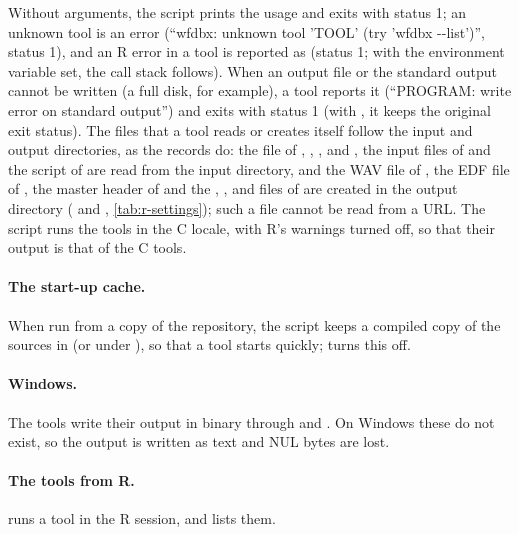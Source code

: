 Without arguments, the script prints the usage and exits with status 1; an unknown tool
is an error (``wfdbx: unknown tool 'TOOL' (try 'wfdbx -{}-list')'', status 1), and an R
error in a tool is reported as  (status 1; with the
environment variable  set, the call stack follows). When an output file
or the standard output cannot be written (a full disk, for example), a tool reports it
(``PROGRAM: write error on standard output'') and exits with status 1 (with , it keeps the original exit status). The files that a tool
reads or creates itself follow the input and output directories, as the records do: the
 file of , , ,  and
, the input files of  and the  script of
 are read from the input directory, and the WAV file of , the
EDF file of , the master header of  and the ,
,  and  files of  are created in the
output directory ( and ,
\cref{tab:r-settings}); such a file cannot be read from a URL. The script runs the tools
in the C locale, with R's warnings turned off, so that their output is that of the C
tools.

\paragraph{The start-up cache.} When run from a copy of the repository, the script keeps a
compiled copy of the sources in  (or under
), so that a tool starts quickly;  turns
this off.

\paragraph{Windows.} The tools write their output in binary through  and
. On Windows these do not exist, so the output is written as text and
NUL bytes are lost.

\paragraph{The tools from R.}  runs a tool in the R session, and
 lists them.


